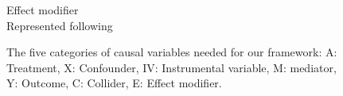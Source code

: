 \documentclass[10pt,letterpaper]{article}
\begin{document}
\begin{figure}[h!]
\begin{minipage}[t]{0.4\linewidth}
    \small\sffamily Effect modifier \scriptsize\\Represented
    following \cite{attia2022proposal}
  \end{minipage}
  \caption{The five categories of causal variables needed for our framework: A:
    Treatment, X: Confounder, IV: Instrumental variable, M: mediator, Y:
    Outcome, C: Collider, E: Effect modifier.}\label{fig:causal_variables}
\end{figure}
\clearpage





\end{document}
